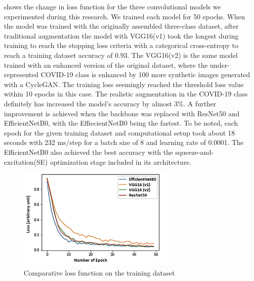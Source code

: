  shows the change in loss function for the three convolutional models we experimented during this research. We trained each model for 50 epochs. When the model was trained with the originally assembled three-class dataset, after traditional augmentation the model with VGG16(v1) took the longest during training to reach the stopping loss criteria with a categorical cross-entropy to reach a training dataset accuracy of 0.93. The VGG16(v2) is the same model trained with an enhanced version of the original dataset, where the under-represented COVID-19 class is enhanced by 100 more synthetic images generated with a CycleGAN. The training loss seemingly reached the threshold loss value within 10 epochs in this case. The realistic augmentation in the COVID-19 class definitely has increased the model's accuracy by almost 3\%. A further improvement is achieved when the backbone was replaced with ResNet50 and EfficientNetB0, with the EffiecientNetB0 being the fastest. To be noted, each epoch for the given training dataset and computational setup took about 18 seconds with 232 ms/step for a batch size of 8 and learning rate of 0.0001. The EfficientNetB0  also achieved the best accuracy with the squeeze-and-excitation(SE) optimization stage included in its architecture.

\begin{figure}
\centering
\includegraphics[width=0.69\textwidth]{images/Loss_edit.png}
   \caption{Comparative loss function on the training dataset}
\label{fig:loss}
\end{figure}

